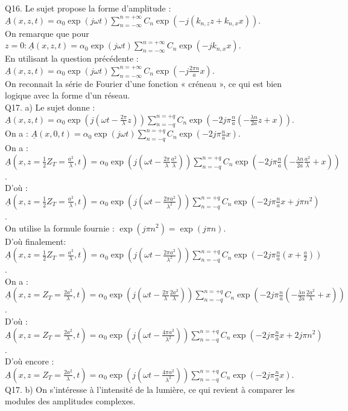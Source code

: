 \documentclass[10pt]{article}
\begin{document}
Q16. Le sujet propose la forme d'amplitude : \(\underline{A}(x, z, t)=\alpha_{0} \exp (j \omega t) \sum_{n=-\infty}^{n=+\infty} C_{n} \exp \left(-j\left(k_{n, z} z+k_{n, x} x\right)\right)\).\\
On remarque que pour \(z=0: \underline{A}(x, z, t)=\alpha_{0} \exp (j \omega t) \sum_{n=-\infty}^{n=+\infty} C_{n} \exp \left(-j k_{n, x} x\right)\).\\
En utilisant la question précédente : \(\underline{A}(x, z, t)=\alpha_{0} \exp (j \omega t) \sum_{n=-\infty}^{n=+\infty} C_{n} \exp \left(-j \frac{2 \pi n}{a} x\right)\).\\
On reconnait la série de Fourier d'une fonction « créneau », ce qui est bien logique avec la forme d'un réseau.\\
Q17. a) Le sujet donne : \(\underline{A}(x, z, t)=\alpha_{0} \exp \left(j\left(\omega t-\frac{2 \pi}{\lambda} z\right)\right) \sum_{n=-q}^{n=+q} C_{n} \exp \left(-2 j \pi \frac{n}{a}\left(-\frac{\lambda n}{2 a} z+x\right)\right)\).\\
On a : \(\underline{A}(x, 0, t)=\alpha_{0} \exp (j \omega t) \sum_{n=-q}^{n=+q} C_{n} \exp \left(-2 j \pi \frac{n}{a} x\right)\).\\
On a : \(\underline{A}\left(x, z=\frac{1}{2} Z_{T}=\frac{a^{2}}{\lambda}, t\right)=\alpha_{0} \exp \left(j\left(\omega t-\frac{2 \pi}{\lambda} \frac{a^{2}}{\lambda}\right)\right) \sum_{n=-q}^{n=+q} C_{n} \exp \left(-2 j \pi \frac{n}{a}\left(-\frac{\lambda n}{2 a} \frac{a^{2}}{\lambda}+x\right)\right)\).\\
D'où : \(\underline{A}\left(x, z=\frac{1}{2} Z_{T}=\frac{a^{2}}{\lambda}, t\right)=\alpha_{0} \exp \left(j\left(\omega t-\frac{2 \pi a^{2}}{\lambda^{2}}\right)\right) \sum_{n=-q}^{n=+q} C_{n} \exp \left(-2 j \pi \frac{n}{a} x+j \pi n^{2}\right)\).\\
On utilise la formule fournie : \(\exp \left(j \pi n^{2}\right)=\exp (j \pi n)\).\\
D'où finalement: \(\underline{A}\left(x, z=\frac{1}{2} Z_{T}=\frac{a^{2}}{\lambda}, t\right)=\alpha_{0} \exp \left(j\left(\omega t-\frac{2 \pi a^{2}}{\lambda^{2}}\right)\right) \sum_{n=-q}^{n=+q} C_{n} \exp \left(-2 j \pi \frac{n}{a}\left(x+\frac{a}{2}\right)\right)\).\\
On a : \(\underline{A}\left(x, z=Z_{T}=\frac{2 a^{2}}{\lambda}, t\right)=\alpha_{0} \exp \left(j\left(\omega t-\frac{2 \pi}{\lambda} \frac{2 a^{2}}{\lambda}\right)\right) \sum_{n=-q}^{n=+q} C_{n} \exp \left(-2 j \pi \frac{n}{a}\left(-\frac{\lambda n}{2 a} \frac{2 a^{2}}{\lambda}+x\right)\right)\).\\
D'où : \(\underline{A}\left(x, z=Z_{T}=\frac{2 a^{2}}{\lambda}, t\right)=\alpha_{0} \exp \left(j\left(\omega t-\frac{4 \pi a^{2}}{\lambda^{2}}\right)\right) \sum_{n=-q}^{n=+q} C_{n} \exp \left(-2 j \pi \frac{n}{a} x+2 j \pi n^{2}\right)\).\\
D'où encore : \(\underline{A}\left(x, z=Z_{T}=\frac{2 a^{2}}{\lambda}, t\right)=\alpha_{0} \exp \left(j\left(\omega t-\frac{4 \pi a^{2}}{\lambda^{2}}\right)\right) \sum_{n=-q}^{n=+q} C_{n} \exp \left(-2 j \pi \frac{n}{a} x\right)\).\\
Q17. b) On s'intéresse à l'intensité de la lumière, ce qui revient à comparer les modules des amplitudes complexes.
\end{document}
